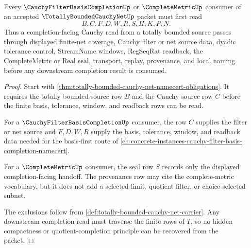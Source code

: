 \begin{theorem}
\label{thm:totally-bounded-cauchy-net-filter-handoff}
Every $\CauchyFilterBasisCompletionUp$ or $\CompleteMetricUp$ consumer of an accepted $\TotallyBoundedCauchyNetUp$ packet must first read
$$
B,C,F,D,W,R,S,H,K,P,N.
$$
Thus a completion-facing Cauchy read from a totally bounded source passes through displayed finite-net coverage, Cauchy filter or net source data, dyadic tolerance control, StreamName windows, RegSeqRat readback, the CompleteMetric or Real seal, transport, replay, provenance, and local naming before any downstream completion result is consumed.
\end{theorem}
\begin{proof}
Start with \autoref{thm:totally-bounded-cauchy-net-namecert-obligations}. It requires the totally bounded source row $B$ and the Cauchy source row $C$ before the finite basis, tolerance, window, and readback rows can be read.

For a $\CauchyFilterBasisCompletionUp$ consumer, the row $C$ supplies the filter or net source and $F,D,W,R$ supply the basis, tolerance, window, and readback data needed for the basis-first route of \autoref{ch:concrete-instances-cauchy-filter-basis-completion-namecert}.

For a $\CompleteMetricUp$ consumer, the seal row $S$ records only the displayed completion-facing handoff. The provenance row may cite the complete-metric vocabulary, but it does not add a selected limit, quotient filter, or choice-selected subnet.

The exclusions follow from \autoref{def:totally-bounded-cauchy-net-carrier}. Any downstream completion read must traverse the finite rows of $T$, so no hidden compactness or quotient-completion principle can be recovered from the packet.
\end{proof}



